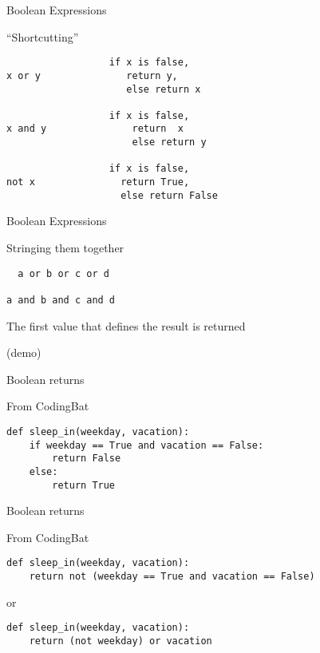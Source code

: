 \documentclass{beamer}
\begin{document}
\begin{frame}[fragile]{Boolean Expressions}

{\Large ``Shortcutting''}

\begin{verbatim}
                  if x is false, 
x or y               return y,
                     else return x

                  if x is false,
x and y               return  x
                      else return y

                  if x is false,
not x               return True,
                    else return False 
\end{verbatim}

\end{frame} 

\begin{frame}[fragile]{Boolean Expressions}

{\Large Stringing them together}

\begin{verbatim}
￼ a or b or c or d

a and b and c and d  
\end{verbatim}

{\Large The first value that defines the result is returned}

\vfill
(demo)
\end{frame}


\begin{frame}[fragile]{Boolean returns}

{\Large From CodingBat}
\vfill
\begin{verbatim}
def sleep_in(weekday, vacation):
    if weekday == True and vacation == False:
        return False
    else:
        return True
\end{verbatim}

\end{frame}


\begin{frame}[fragile]{Boolean returns}

{\Large From CodingBat}


\begin{verbatim}
def sleep_in(weekday, vacation):
    return not (weekday == True and vacation == False)
\end{verbatim}

or

\begin{verbatim}
def sleep_in(weekday, vacation):
    return (not weekday) or vacation
\end{verbatim}


\end{frame}
\end{document}
